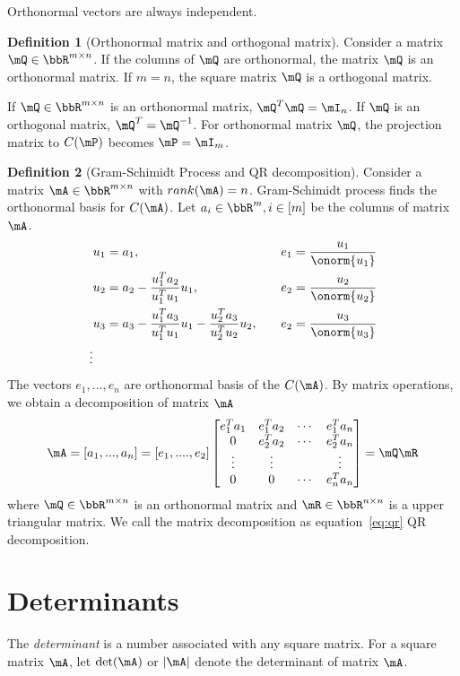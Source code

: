 \documentclass[11pt]{article}
\theoremstyle{plain}
\theoremstyle{definition}
\newtheorem{defn}{Definition}
\begin{document}
Orthonormal vectors are always independent.

\begin{defn}[Orthonormal matrix and orthogonal matrix]\label{def:orthonom}
	Consider a matrix $\mQ \in \bbR^{m \times n}$. If the columns of $\mQ$ are orthonormal, the matrix $\mQ$ is an orthonormal matrix. If $ m= n$, the square matrix $\mQ$ is a orthogonal matrix.
\end{defn}

If $\mQ \in \bbR^{m \times n}$ is an orthonormal matrix, $\mQ^T \mQ = \mI_n$.  If $\mQ$ is an orthogonal matrix, $\mQ^T = \mQ^{-1}$.
For orthonormal matrix $\mQ$, the projection matrix to $C(\mP)$  becomes $\mP = \mI_m$.

\begin{defn}[Gram-Schimidt Process and QR decomposition]\label{gram-schimidt}
Consider a matrix $\mA \in \bbR^{m \times n}$ with $rank(\mA) = n$. Gram-Schimidt process finds the orthonormal basis for $C(\mA)$. Let $a_i \in \bbR^{m}, i \in [m]$ be the columns of matrix $\mA$. 
\begin{align}
	&u_1 = a_1, &&\quad e_1 = \frac{u_1}{\onorm{u_1}}\\
	&u_2 = a_2 - \frac{u_1^T a_2}{u_1^T u_1} u_1 ,&&\quad  e_2 = \frac{u_2}{\onorm{u_2}}\\
	&u_3 = a_3 - \frac{u_1^T a_3}{u_1^T u_1} u_1 - \frac{u_2^T a_3}{u_2^T u_2} u_2,&&\quad  e_2 = \frac{u_3}{\onorm{u_3}}\\
	\vdots
\end{align}
 The vectors $e_1,...,e_n$ are orthonormal basis of the $C(\mA)$. By matrix operations, we obtain a decomposition of matrix $\mA$
 \begin{equation}\label{eq:qr}
 	\mA = [a_1,...,a_n] = [e_1,....,e_2] \begin{bmatrix}
 		e_1^T a_1 & e_1^T a_2 & \cdots & e_1^T a_n\\
 		0&e_2^T a_2 & \cdots & e_2^T a_n\\
 		\vdots &\vdots & & \vdots \\
 		0 &0&\cdots & e_n^T a_n
 	\end{bmatrix} = \mQ \mR
 \end{equation}
	where $\mQ \in \bbR^{m \times n}$ is an orthonormal matrix and $\mR \in \bbR^{n \times n}$ is a upper triangular matrix. We call the matrix decomposition as equation~\eqref{eq:qr} QR decomposition.
\end{defn}

\section{Determinants}
The \textit{determinant} is a number associated with any square matrix. For a square matrix $\mA$, let $\det(\mA)$ or $|\mA|$ denote the determinant of matrix $\mA$.
\end{document}
